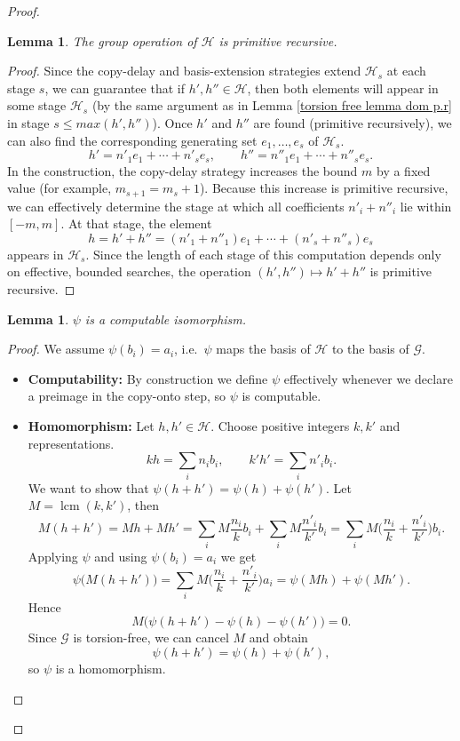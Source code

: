 \documentclass{pracalicmgr2025}
\theoremstyle{plain}            %
\newtheorem{lemma}[theorem]{Lemma}
\theoremstyle{remark}           %
\theoremstyle{definition}       %
\begin{document}
\begin{proof}
\begin{lemma} \label{torsion free lemma operation p.r}
     The group operation of $\mathcal{H}$ is primitive recursive. 
\end{lemma}
\begin{proof}
   Since the copy-delay and basis-extension strategies extend $\mathcal{H}_s$ at each stage $s$, we can guarantee that if $h',h'' \in \mathcal{H}$, then both elements will appear in some stage $\mathcal{H}_s$ (by the same argument as in Lemma \ref{torsion free lemma dom p.r} in stage $s \le max(h',h'')$). Once $h'$ and $h''$ are found (primitive recursively), we can also find the corresponding generating set $e_1,\dots,e_s$ of $\mathcal{H}_s$. 
    $$
    h' = n'_1 e_1 + \cdots + n'_s e_s, \qquad 
    h'' = n''_1 e_1 + \cdots + n''_s e_s.
    $$
    In the construction, the copy-delay strategy increases the bound $m$ by a fixed value (for example, $m_{s+1}=m_s+1$). 
    Because this increase is primitive recursive, we can effectively determine the stage at which all coefficients $n'_i+n''_i$ lie within $[-m,m]$. 
    At that stage, the element
    $$
    h = h'+h'' = (n'_1+n''_1)e_1 + \cdots + (n'_s+n''_s)e_s
    $$
    appears in $\mathcal{H}_s$. 
    Since the length of each stage of this computation depends only on effective, bounded searches, the operation $(h',h'') \mapsto h'+h''$ is primitive recursive.
\end{proof}

\begin{lemma}
    $\psi$ is a computable isomorphism.
\end{lemma}
    \begin{proof}      
    We assume $\psi(b_i)=a_i$, i.e.\ $\psi$ maps the basis of $\mathcal H$ to the basis of $\mathcal G$.
    \begin{itemize}    
    \item \textbf{Computability:}
    By construction we define $\psi$ effectively whenever we declare a preimage in the copy-onto step, so $\psi$ is computable.
    
    \item \textbf{Homomorphism:} Let $h,h'\in\mathcal H$. Choose positive integers $k,k'$ and representations.
    $$
    k h=\sum_i n_i b_i, \qquad k' h'=\sum_i n'_i b_i.
    $$
    We want to show that $\psi(h + h') = \psi(h) +\psi(h')$. Let $M=\operatorname{lcm}(k,k')$, then
    $$
    M(h+h')=Mh+Mh'=\sum_i M\frac{n_i}{k}b_i+\sum_i M\frac{n'_i}{k'}b_i
    = \sum_i M\Big(\frac{n_i}{k}+\frac{n'_i}{k'}\Big)b_i.
    $$
    Applying $\psi$ and using $\psi(b_i)=a_i$ we get
    $$
    \psi\big(M(h+h')\big)
    = \sum_i M\Big(\frac{n_i}{k}+\frac{n'_i}{k'}\Big)a_i
    = \psi(Mh)+\psi(Mh').
    $$
    Hence
    $$
    M\big(\psi(h+h')-\psi(h)-\psi(h')\big)=0.
    $$
    Since $\mathcal G$ is torsion-free, we can cancel $M$ and obtain
    $$
    \psi(h+h')=\psi(h)+\psi(h'),
    $$
    so $\psi$ is a homomorphism.
    

\end{itemize}
\end{proof}
\end{proof}
\end{document}

